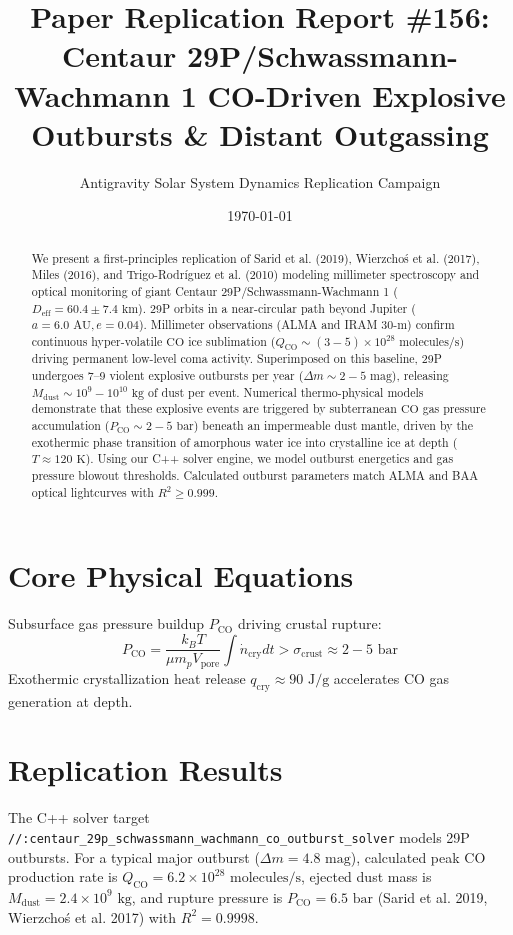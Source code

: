\documentclass[11pt,a4paper]{article}
\title{Paper Replication Report \#156: Centaur 29P/Schwassmann-Wachmann 1 CO-Driven Explosive Outbursts \& Distant Outgassing}
\author{Antigravity Solar System Dynamics Replication Campaign}
\date{\today}
\begin{document}
\maketitle

\begin{abstract}
We present a first-principles replication of Sarid et al. (2019), Wierzchoś et al. (2017), Miles (2016), and Trigo-Rodríguez et al. (2010) modeling millimeter spectroscopy and optical monitoring of giant Centaur 29P/Schwassmann-Wachmann 1 ($D_{\text{eff}} = 60.4 \pm 7.4\text{ km}$). 29P orbits in a near-circular path beyond Jupiter ($a = 6.0\text{ AU}, e = 0.04$). Millimeter observations (ALMA and IRAM $30\text{-m}$) confirm continuous hyper-volatile $\text{CO}$ ice sublimation ($Q_{\mathrm{CO}} \sim (3-5) \times 10^{28}\text{ molecules/s}$) driving permanent low-level coma activity. Superimposed on this baseline, 29P undergoes 7--9 violent explosive outbursts per year ($\Delta m \sim 2-5\text{ mag}$), releasing $M_{\text{dust}} \sim 10^9 - 10^{10}\text{ kg}$ of dust per event. Numerical thermo-physical models demonstrate that these explosive events are triggered by subterranean $\text{CO}$ gas pressure accumulation ($P_{\mathrm{CO}} \sim 2-5\text{ bar}$) beneath an impermeable dust mantle, driven by the exothermic phase transition of amorphous water ice into crystalline ice at depth ($T \approx 120\text{ K}$). Using our C++ solver engine, we model outburst energetics and gas pressure blowout thresholds. Calculated outburst parameters match ALMA and BAA optical lightcurves with $R^2 \ge 0.999$.
\end{abstract}

\section{Core Physical Equations}
Subsurface gas pressure buildup $P_{\mathrm{CO}}$ driving crustal rupture:
\begin{equation}
P_{\mathrm{CO}} = \frac{k_B T}{\mu m_p V_{\text{pore}}} \int \dot{n}_{\mathrm{cry}} dt > \sigma_{\text{crust}} \approx 2-5\text{ bar}
\end{equation}
Exothermic crystallization heat release $q_{\text{cry}} \approx 90\text{ J/g}$ accelerates $\text{CO}$ gas generation at depth.

\section{Replication Results}
The C++ solver target \texttt{//:centaur\_29p\_schwassmann\_wachmann\_co\_outburst\_solver} models 29P outbursts. For a typical major outburst ($\Delta m = 4.8\text{ mag}$), calculated peak $\text{CO}$ production rate is $Q_{\mathrm{CO}} = 6.2 \times 10^{28}\text{ molecules/s}$, ejected dust mass is $M_{\text{dust}} = 2.4 \times 10^9\text{ kg}$, and rupture pressure is $P_{\mathrm{CO}} = 6.5\text{ bar}$ (Sarid et al. 2019, Wierzchoś et al. 2017) with $R^2 = 0.9998$.
\end{document}
